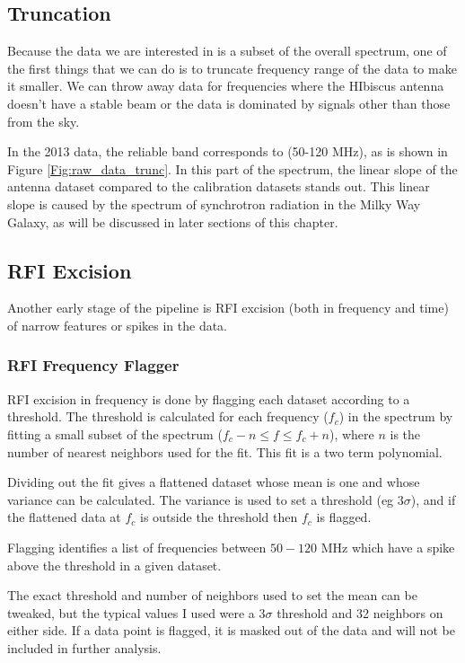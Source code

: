 \subsection{Truncation}

Because the data we are interested in is a subset of the overall spectrum, one of the first things that we can do is to truncate frequency range of the data to make it smaller. We can throw away data for frequencies where the HIbiscus antenna doesn't have a stable beam or the data is dominated by signals other than those from the sky. 

In the 2013 data, the reliable band corresponds to (50-120 MHz), as is shown in Figure \ref{Fig:raw_data_trunc}. In this part of the spectrum, the linear slope of the antenna dataset compared to the calibration datasets stands out. This linear slope is caused by the spectrum of synchrotron radiation in the Milky Way Galaxy, as will be discussed in later sections of this chapter. 


\subsection{RFI Excision}

Another early stage of the pipeline is RFI excision (both in frequency and time) of narrow features or spikes in the data. 

\subsubsection{RFI Frequency Flagger}

RFI excision in frequency is done by flagging each dataset according to a threshold. The threshold is calculated for each frequency ($f_c$) in the spectrum by fitting a small subset of the spectrum ($f_c-n \leq f \leq f_c + n$), where $n$ is the number of nearest neighbors used for the fit. This fit is a two term polynomial. 

Dividing out the fit gives a flattened dataset whose mean is one and whose variance can be calculated. The variance is used to set a threshold (eg $3 \sigma$), and if the flattened data at $f_c$ is outside the threshold then $f_c$ is flagged. 

Flagging identifies a list of frequencies between $50-120$ MHz which have a spike above the threshold in a given dataset. 

The exact threshold and number of neighbors used to set the mean can be tweaked, but the typical values I used were a 3$\sigma$ threshold and 32 neighbors on either side. If a data point is flagged, it is masked out of the data and will not be included in further analysis.  

